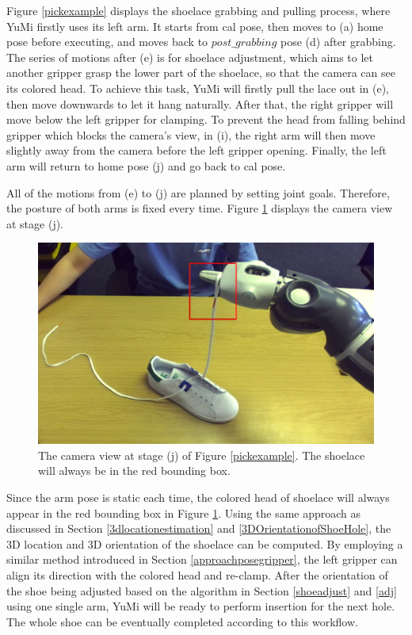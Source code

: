 Figure \ref{pickexample} displays the shoelace grabbing and pulling process, where YuMi firstly uses its left arm. It starts from cal pose, then moves to (a) home pose before executing, and moves back to $post\_grabbing$ pose (d) after grabbing. The series of motions after (e) is for shoelace adjustment, which aims to let another gripper grasp the lower part of the shoelace, so that the camera can see its colored head. To achieve this task, YuMi will firstly pull the lace out in (e), then move downwards to let it hang naturally. After that, the right gripper will move below the left gripper for clamping. To prevent the head from falling behind gripper which blocks the camera's view, in (i), the right arm will then move slightly away from the camera before the left gripper opening. Finally, the left arm will return to home pose (j) and go back to cal pose. 

All of the motions from (e) to (j) are planned by setting joint goals. Therefore, the posture of both arms is fixed every time. Figure \ref{3dlace} displays the camera view at stage (j).

\begin{figure}[H]
\centering
\includegraphics[width = 0.6\columnwidth]{Implementation/mp/3dlace.jpg}
\caption{The camera view at stage (j) of Figure \ref{pickexample}. The shoelace will always be in the red bounding box.}
\label{3dlace}
\end{figure}

Since the arm pose is static each time, the colored head of shoelace will always appear in the red bounding box in Figure \ref{3dlace}. Using the same approach as discussed in Section \ref{3dlocationestimation} and \ref{3DOrientationofShoeHole}, the 3D location and 3D orientation of the shoelace can be computed. By employing a similar method introduced in Section \ref{approachposegripper}, the left gripper can align its direction with the colored head and re-clamp. After the orientation of the shoe being adjusted based on the algorithm in Section \ref{shoeadjust} and \ref{adj} using one single arm, YuMi will be ready to perform insertion for the next hole. The whole shoe can be eventually completed according to this workflow.